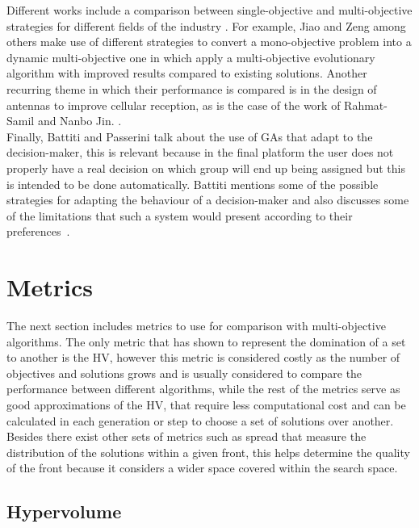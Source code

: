 Different works include a comparison between single-objective and multi-objective strategies for different fields of the industry \cite{mehboob2016genetic,leal2018aero,shiau1994multiobjective}. For example, Jiao and Zeng \cite{Jiao2017DynamicME} among others make use of different strategies to convert a mono-objective problem into a dynamic multi-objective one in which apply a multi-objective evolutionary algorithm with improved results compared to existing solutions. Another recurring theme in which their performance is compared is in the design of antennas to improve cellular reception, as is the case of the work of Rahmat-Samil and Nanbo Jin. \cite{Jin2007-qu}.\\

Finally, Battiti and Passerini \cite{Battiti2010-xo} talk about the use of GAs that adapt to the decision-maker, this is relevant because in the final platform the user does not properly have a real decision on which group will end up being assigned but this is intended to be done automatically. Battiti mentions some of the possible strategies for adapting the behaviour of a decision-maker and also discusses some of the limitations that such a system would present according to their preferences~\cite{Wang2010-zh}.\\

\section{Metrics}

The next section includes metrics to use for comparison with multi-objective algorithms. The only metric that has shown to represent the domination of a set to another is the HV, however this metric is considered costly as the number of objectives and solutions grows and is usually considered to compare the performance between different algorithms, while the rest of the metrics serve as good approximations of the HV, that require less computational cost and can be calculated in each generation or step to choose a set of solutions over another. Besides there exist other sets of metrics such as spread that measure the distribution of the solutions within a given front, this helps determine the quality of the front because it considers a wider space covered within the search space.\\

\subsection{Hypervolume}

